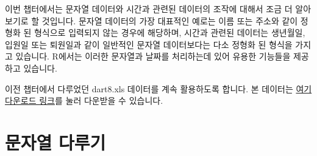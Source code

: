 %
%
%
%
%

이번 챕터에서는 문자열 데이터와 시간과 관련된 데이터의 조작에 대해서 조금 더 알아보기로 할 것입니다.
문자열 데이터의 가장 대표적인 예로는 이름 또는 주소와 같이 정형화 된 형식으로 입력되지 않는 경우에 해당하며, 
시간과 관련된 데이터는 생년월일, 입원일 또는 퇴원일과 같이 일반적인 문자열 데이터보다는 다소 정형화 된 형식을 가지고 있습니다.
R에서는 이러한 문자열과 날짜를 처리하는데 있어 유용한 기능들을 제공하고 있습니다.

이전 챕터에서 다루었던 dart8.xls 데이터를 계속 활용하도록 합니다. 
본 데이터는 \href{http://korea.gnu.org/gnustats/dataset/dart8.xls}{여기 다운로드 링크}를 눌러 다운받을 수 있습니다.

\section{문자열 다루기}

